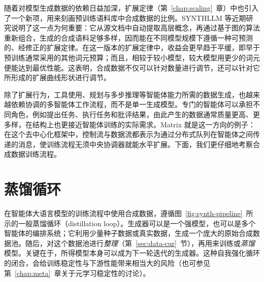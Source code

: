 随着对模型生成数据的依赖日益加深，扩展定律（第~\ref{chap:scaling}~章）中也引入了一个新项，用来刻画预训练语料库中合成数据的比例。SYNTHLLM \citep{qin2025scaling} 等近期研究说明了这一点为何重要：它从源文档中自动提取高层概念，再通过基于图的算法重新组合，生成的合成语料足够多样，因而能在不同模型规模下遵循一种可预测的、经修正的扩展定律。在这一版本的扩展定律中，收益会更早趋于平缓，即早于预训练通常采用的其他词元预算；而且，相较于较小模型，较大模型用更少的词元便能达到最优性能。这表明，合成数据不仅可以针对数量进行调节，还可以针对它所形成的扩展曲线形状进行调节。

除了扩展行为，工具使用、规划与多步推理等智能体能力所需的数据生成，也越来越依赖协调的多智能体工作流程，而不是单一生成模型。专门的智能体可以承担不同角色，例如提出任务、执行任务和批评结果，由此产生的数据通常质量更高、更多样，在结构上也更接近智能体训练的实际需求。Matrix \citep{wang2025matrixpeertopeermultiagentsynthetic} 就是这一方向的例子：在这个去中心化框架中，控制流与数据流都表示为通过分布式队列在智能体之间传递的消息，使训练流程无须中央协调器就能水平扩展。下面，我们更仔细地考察合成数据训练流程。


\section{蒸馏循环}
\label{sec:distillation}
在智能体大语言模型的训练流程中使用合成数据，遵循图~\ref{fig:synth-pipeline}~所示的一般蒸馏循环（distillation loop）。生成器可以是一个强模型，也可以是多个智能体的编排系统；它利用少量种子数据或真实数据，生成一个庞大的原始合成数据池。随后，对这个数据池进行{\em 整理}（第~\ref{sec:data-cur}~节），再用来训练或{\em 蒸馏}模型。关键在于，所得模型本身可以成为下一轮迭代的生成器。这种自我强化循环的闭合，会给训练稳定性与下游性能带来相当大的风险（也可参见第~\ref{chap:meta}~章关于元学习稳定性的讨论）。

